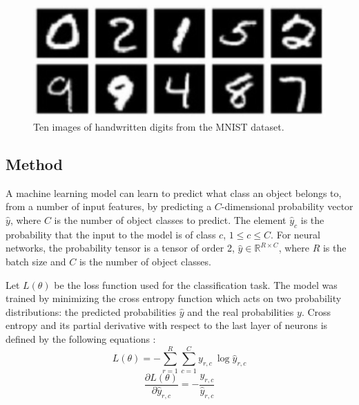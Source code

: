 \documentclass[a4paper, twoside]{article}
\newcommand*{\pd}[2]{\ensuremath{\dfrac{\partial #1}{\partial #2}}}
\begin{document}
\begin{figure}[h]
	\centering
  		\includegraphics[scale=1]{mnist.png}
  	\caption{Ten images of handwritten digits from the MNIST dataset. \cite{MNIST}} \label{figMNIST}
\end{figure}

\subsection{Method}
A machine learning model can learn to predict what class an object belongs to, from a number of input features, by predicting a $C$-dimensional probability vector $\hat{y}$, where $C$ is the number of object classes to predict. The element $\hat{y}_c$ is the probability that the input to the model is of class $c$, $1 \leq c \leq C$. For neural networks, the probability tensor is a tensor of order 2, $\hat{y} \in \mathbb{R}^{R \times C}$, where $R$ is the batch size and $C$ is the number of object classes.

Let $L(\theta)$ be the loss function used for the classification task. The model was trained by minimizing the cross entropy function which acts on two probability distributions: the predicted probabilities $\hat{y}$ and the real probabilities $y$. Cross entropy and its partial derivative with respect to the last layer of neurons is defined by the following equations \cite{cs231n} \cite{notesonbackprop}: 
\begin{equation}\label{crossentropy}
L(\theta) = - \sum^{R }_{r=1} \sum^{C }_{c=1}y_{r,c} \ \log{\hat{y}_{r,c}}
\end{equation}
\begin{equation}\label{dydxcrossentropy}
\pd{L(\theta)}{\hat{y}_{r,c}} = - \frac{y_{r,c}}{\hat{y}_{r,c}}
\end{equation}
\end{document}
